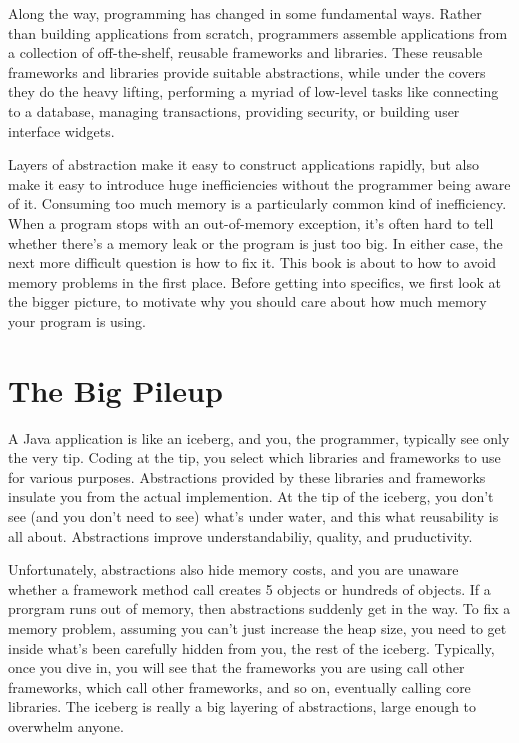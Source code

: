 Along the way, programming has changed in some fundamental ways. Rather than building applications from scratch, programmers 
assemble applications from a collection of off-the-shelf, reusable frameworks
and libraries. These reusable frameworks and libraries provide suitable
abstractions, while under the covers they do the heavy lifting, performing a
myriad of low-level tasks like connecting to a database, managing transactions,
providing security, or building user interface widgets.

Layers of abstraction make it easy to construct applications
rapidly, but also make it easy to introduce huge inefficiencies without the
programmer being aware of it. Consuming too much memory is a particularly common
kind of inefficiency. When a program stops with an out-of-memory exception, it's
often hard to tell whether there's a memory leak or the program is just too big. 
In either case, the next more difficult
question is how to fix it. This book is about to how to avoid memory problems in the first place. Before
getting into specifics, we first look at the bigger picture, to motivate
why you should care about how much memory your program is using.


\section{The Big Pileup}

A Java application is like an iceberg, and you, the programmer, typically see
only the very tip. Coding at the tip, you select which libraries
and frameworks to use for various purposes. Abstractions provided by these
libraries and frameworks insulate you from the actual implemention. At the tip
of the iceberg, you don't see (and you don't need to see) what's under water,
and this what reusability is all about. Abstractions improve understandabiliy, quality, and
pruductivity. 

Unfortunately, abstractions also hide memory costs, and
 you are unaware whether a framework method call creates 5 objects 
or hundreds of objects. If a prorgram runs out of memory,
then abstractions suddenly get in the way. To fix a memory problem, assuming
you can't just increase the heap size, you need to get inside what's been
carefully hidden from you, the rest of the iceberg. Typically, once you dive in,
you will see that the frameworks you are using call
other frameworks, which call other frameworks, and so on, eventually calling
core libraries. The iceberg is really a big layering of abstractions, large
enough to overwhelm anyone. 


